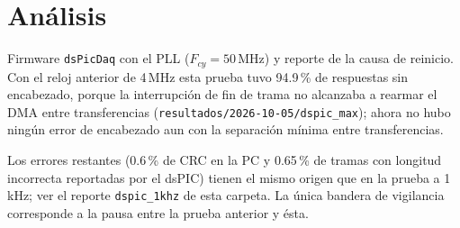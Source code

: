 \section{Análisis}

Firmware \texttt{dsPicDaq} con el PLL ($F_{cy} = 50$\,MHz) y reporte de la
causa de reinicio. Con el reloj anterior de 4\,MHz esta prueba tuvo
94.9\,\% de respuestas sin encabezado, porque la interrupción de fin de trama
no alcanzaba a rearmar el DMA entre transferencias
(\texttt{resultados/2026-10-05/dspic\_max}); ahora no hubo ningún error de
encabezado aun con la separación mínima entre transferencias.

Los errores restantes (0.6\,\% de CRC en la PC y 0.65\,\% de tramas con
longitud incorrecta reportadas por el dsPIC) tienen el mismo origen que en
la prueba a 1\,kHz; ver el reporte \texttt{dspic\_1khz} de esta carpeta. La
única bandera de vigilancia corresponde a la pausa entre la prueba anterior y
ésta.
